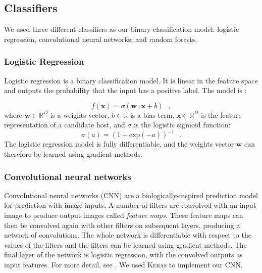 \documentclass[fleqn,usenatbib,usedcolumn]{mnras}
\renewcommand{\vec}[1]{\mathbf{#1}}
\begin{document}
  \subsection{Classifiers}\label{sec:classifiers}

    We used three different classifiers as our binary classification model:
    logistic regression, convolutional neural networks, and random forests.

    \subsubsection{Logistic Regression}
    \label{sec:logistic-regression}
      Logistic regression is a binary classification model. It is linear in the
      feature space and outputs the probability that the input has a positive
      label. The model is \citep{bishop06ml}:

      \begin{equation}
          f(\vec x) = \sigma(\vec w \cdot \vec x + b) \,\,\,\,,
      \end{equation}
      where $\vec w \in \mathbb{R}^D$ is a weights vector,
      $b \in \mathbb{R}$ is a bias term, $\vec x \in \mathbb{R}^D$ is the
      feature representation of a candidate host, and $\sigma$ is the
      logistic sigmoid function: \begin{equation}
          \sigma(a) = (1 + \mathrm{exp}(-a))^{-1}\,\,\,\,.
      \end{equation}%
      The logistic regression model is fully differentiable, and the weights
      vector $\vec w$ can therefore be learned using gradient methods.

    \subsubsection{Convolutional neural networks}
    \label{sec:convolutional-neural-networks}

      Convolutional neural networks (CNN) are a biologically-inspired prediction
      model for prediction with image inputs. A number of filters are convolved
      with an input image to produce output images called \emph{feature maps}.
      These feature maps can then be convolved again with other filters on
      subsequent layers, producing a network of convolutions. The whole network
      is differentiable with respect to the values of the filters and the
      filters can be learned using gradient methods. The final layer of the
      network is logistic regression, with the convolved outputs as input
      features. For more detail, see \citet[subsection II.A][]{lecun98}. We used
      \textsc{Keras} \citep{chollet15keras} to implement our CNN.
\end{document}
